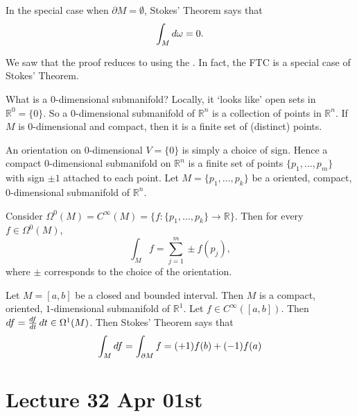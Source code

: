 \documentclass[notoc,notitlepage]{tufte-book}
\begin{document}
\begin{remark}
  In the special case when $\partial M = \emptyset$, Stokes' Theorem says that
  \begin{equation*}
    \int_{M} \mathop{}\!d{\omega} = 0. 
  \end{equation*}
\end{remark}

\begin{remark}
  We saw that the proof reduces to using the . In fact, the FTC is a special case of Stokes' Theorem.

  What is a $0$-dimensional submanifold? Locally, it `looks like' open sets in
  $\mathbb{R}^0 = \{0\}$. So a $0$-dimensional submanifold of $\mathbb{R}^n$ is a
  collection of points in $\mathbb{R}^n$. If $M$ is $0$-dimensional and compact,
  then it is a finite set of (distinct) points.

  An orientation on $0$-dimensional $V = \{0\}$ is simply a choice of sign.
  Hence a compact $0$-dimensional submanifold on $\mathbb{R}^n$ is a finite set
  of points $\{p_1, \ldots, p_m \}$ with sign $\pm 1$ attached to each point.
  Let $M = \{p_1, \ldots, p_k\}$ be a oriented, compact, $0$-dimensional
  submanifold of $\mathbb{R}^n$.

  Consider $\Omega^0(M) = C^\infty(M) = \{ f : \{p_1, \ldots, p_k\} \to
  \mathbb{R} \}$. Then for every $f \in \Omega^0(M)$,
  \begin{equation*}
    \int_{M} f = \sum_{j=1}^{m} \pm f(p_j),
  \end{equation*}
  where $\pm$ corresponds to the choice of the orientation.

  Let $M = [a, b]$ be a closed and bounded interval. Then $M$ is a compact,
  oriented, $1$-dimensional submanifold of $\mathbb{R}^1$. Let $f \in
  C^\infty([a, b])$. Then $\mathop{}\!d{f} = \frac{\mathop{}\!d{f}}{\mathop{}\!d{t}} \mathop{}\!d{t} \in
  \Omega^1(M)$. Then Stokes' Theorem says that
  \begin{equation*}
    \int_{M} \mathop{}\!d{f} = \int_{\partial M} f = (+1) f(b) + (-1) f(a)
  \end{equation*}
\end{remark}



\label{part:differential_geometry}

\chapter{Lecture 32 Apr 01st}%
\label{chp:lecture_32_apr_01st}
\end{document}
